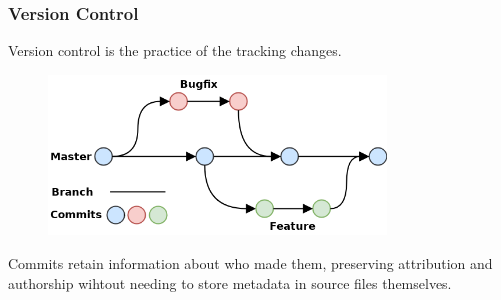 \begin{frame}
    \frametitle{Version Control}
    \begin{center}
        Version control is the practice of the tracking changes.
    \end{center}

 \begin{figure}[htpb]
      \centering
      \includegraphics[width=0.8\textwidth]{images/github-flow.png}
  \end{figure}

   Commits retain information about who made them, preserving attribution and authorship wihtout needing to store metadata in source files themselves. 
\end{frame}



%

